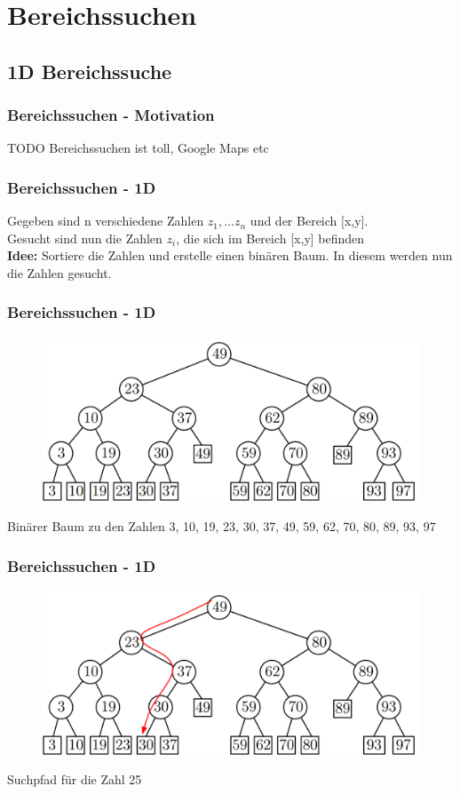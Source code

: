 \section{Bereichssuchen}
\subsection{1D Bereichssuche}
\begin{frame}
	\frametitle{Bereichssuchen - Motivation}
	TODO Bereichssuchen ist toll, Google Maps etc
\end{frame}

\begin{frame}
	\frametitle{Bereichssuchen - 1D}
	Gegeben sind n verschiedene Zahlen $z_1, ... z_n$ und der Bereich [x,y].\\
	Gesucht sind nun die Zahlen $z_i$, die sich im Bereich [x,y] befinden \\
	\pause
	\textbf{Idee:} Sortiere die Zahlen und erstelle einen binären Baum. In diesem werden nun die Zahlen gesucht.
\end{frame}

\begin{frame}
	\frametitle{{Bereichssuchen - 1D}}
\begin{figure}[htbp]
	\begin{center}
  	\includegraphics[width=.8\linewidth]{bilder/1d}
	\end{center}
\end{figure}
Binärer Baum zu den Zahlen 3, 10, 19, 23, 30, 37, 49, 59, 62, 70, 80, 89, 93, 97
\end{frame}

\begin{frame}
	\frametitle{{Bereichssuchen - 1D}}
\begin{figure}[htbp]
	\begin{center}
  	\includegraphics[width=.8\linewidth]{bilder/1d2}
	\end{center}
\end{figure}
Suchpfad für die Zahl 25
\end{frame}

